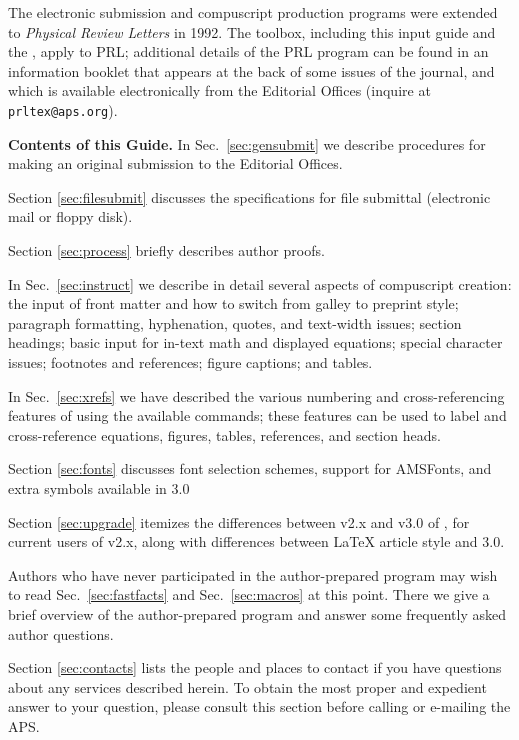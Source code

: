 The electronic submission and compuscript production programs were extended
to {\em Physical Review Letters\/} in 1992. The toolbox, including this
input guide and the \SNG{}, apply to PRL; additional details of the PRL
program can be found in an information booklet that appears at the back of
some issues of the journal, and which is available electronically from the
Editorial Offices (inquire at \verb+prltex@aps.org+).

{\bf Contents of this Guide.} In Sec.\ \ref{sec:gensubmit} we describe
procedures for making an original submission to the Editorial Offices.


Section \ref{sec:filesubmit} discusses the specifications for file
submittal (electronic mail or floppy disk).

Section \ref{sec:process}  briefly describes author proofs.

In Sec.\ \ref{sec:instruct} we describe in detail several aspects of
compuscript creation: the input of front matter and how to switch from
galley to preprint style; paragraph formatting, hyphenation, quotes, and
text-width issues; section headings; basic input for in-text math and
displayed equations; special character issues; footnotes and references;
figure captions; and tables.

In Sec.\ \ref{sec:xrefs} we have described the various numbering and
cross-referencing features of \REVTeX{} using the available commands; these
features can be used to label and cross-reference equations, figures,
tables, references, and section heads.

Section \ref{sec:fonts} discusses font selection schemes, support for
AMSFonts, and extra symbols available in \REVTeX{} 3.0

Section \ref{sec:upgrade} itemizes the differences between v2.x and v3.0 of
\REVTeX{}, for current users of v2.x, along with differences between
\LaTeX{} article style and \REVTeX{} 3.0.

Authors who have never participated in the author-prepared program may wish
to read Sec.\ \ref{sec:fastfacts} and  Sec.\ \ref{sec:macros} at this
point. There we give a brief overview of the author-prepared program and
answer some frequently asked author questions.

Section \ref{sec:contacts} lists the people and places to contact if you
have questions about any services described herein.  To obtain the most
proper and expedient answer to your question, please consult this section
before calling or e-mailing the APS.

